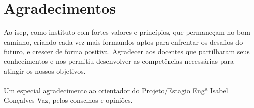 \chapter*{Agradecimentos}
\label{Agradecimentos}
Ao \ac{isep}, como instituto com fortes valores e princípios, que permaneçam no bom caminho, criando cada vez mais formandos aptos para enfrentar os desafios do futuro, e crescer de forma positiva. Agradecer aos docentes que partilharam seus conhecimentos e nos permitiu desenvolver as competências necessárias para atingir os nossos objetivos. \\
\\
Um especial agradecimento ao orientador do Projeto/Estagio Engª Isabel Gonçalves Vaz, pelos conselhos e opiniões.
